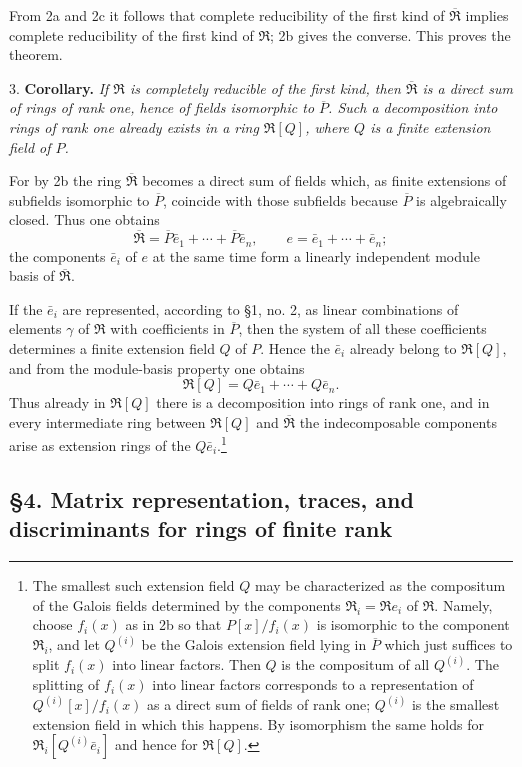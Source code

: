 \documentclass[11pt]{article}
\providecommand{\mR}{\mathfrak{R}}
\providecommand{\bR}{\overline{\mathfrak{R}}}
\providecommand{\bP}{\overline{P}}
\begin{document}
From 2a and 2c it follows that complete reducibility of the first kind of $\bR$ implies complete reducibility of the first kind of $\mR$; 2b gives the converse. This proves the theorem.

3. \textbf{Corollary.} \emph{If $\mR$ is completely reducible of the first kind, then $\bR$ is a direct sum of rings of rank one, hence of fields isomorphic to $\bP$. Such a decomposition into rings of rank one already exists in a ring $\mR[Q]$, where $Q$ is a finite extension field of $P$.}

For by 2b the ring $\bR$ becomes a direct sum of fields which, as finite extensions of subfields isomorphic to $\bP$, coincide with those subfields because $\bP$ is algebraically closed. Thus one obtains
\[
        \bR=\bP\bar e_1+\cdots+\bP\bar e_n,
        \qquad e=\bar e_1+\cdots+\bar e_n;
\]
the components $\bar e_i$ of $e$ at the same time form a linearly independent module basis of $\bR$.

If the $\bar e_i$ are represented, according to §1, no. 2, as linear combinations of elements $\gamma$ of $\mR$ with coefficients in $\bP$, then the system of all these coefficients determines a finite extension field $Q$ of $P$. Hence the $\bar e_i$ already belong to $\mR[Q]$, and from the module-basis property one obtains
\[
        \mR[Q]=Q\bar e_1+\cdots+Q\bar e_n.
\]
Thus already in $\mR[Q]$ there is a decomposition into rings of rank one, and in every intermediate ring between $\mR[Q]$ and $\bR$ the indecomposable components arise as extension rings of the $Q\bar e_i$.\footnote{The smallest such extension field $Q$ may be characterized as the compositum of the Galois fields determined by the components $\mR_i=\mR e_i$ of $\mR$. Namely, choose $f_i(x)$ as in 2b so that $P[x]/f_i(x)$ is isomorphic to the component $\mR_i$, and let $Q^{(i)}$ be the Galois extension field lying in $\bP$ which just suffices to split $f_i(x)$ into linear factors. Then $Q$ is the compositum of all $Q^{(i)}$. The splitting of $f_i(x)$ into linear factors corresponds to a representation of $Q^{(i)}[x]/f_i(x)$ as a direct sum of fields of rank one; $Q^{(i)}$ is the smallest extension field in which this happens. By isomorphism the same holds for $\mR_i[Q^{(i)}\bar e_i]$ and hence for $\mR[Q]$.}

\subsection*{§4. Matrix representation, traces, and discriminants for rings of finite rank}
\end{document}
